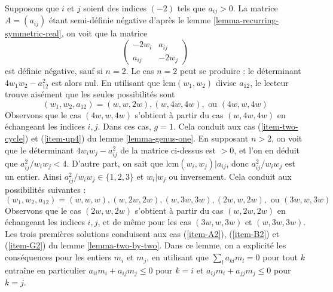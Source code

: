 \medskip\noindent
Supposons que $i$ et $j$ soient des indices $(-2)$ tels que $a_{ij} > 0$.
La matrice $A = (a_{ij})$ étant semi-définie négative d'après le
lemme \ref{lemma-recurring-symmetric-real}, on voit que la matrice
$$
\left(
\begin{matrix}
-2w_i & a_{ij} \\
a_{ij} & -2w_j
\end{matrix}
\right)
$$
est définie négative, sauf si $n = 2$. Le cas $n = 2$ peut se produire :
le déterminant $4w_1w_2 - a_{12}^2$ est alors nul. En utilisant que
$\text{lcm}(w_1, w_2)$ divise $a_{12}$, le lecteur trouve aisément
que les seules possibilités sont
$$
(w_1, w_2, a_{12}) = (w, w, 2w), (w, 4w, 4w), \text{ ou }(4w, w, 4w)
$$
Observons que le cas $(4w, w, 4w)$ s'obtient à partir du cas
$(w, 4w, 4w)$ en échangeant les indices $i, j$.
Dans ces cas, $g = 1$. Cela conduit aux cas
(\ref{item-two-cycle}) et (\ref{item-up4}) du lemme \ref{lemma-genus-one}.
En supposant $n > 2$, on voit
que le déterminant $4w_iw_j - a_{ij}^2$ de la matrice ci-dessus
est $> 0$, et l'on en déduit que $a_{ij}^2/w_iw_j < 4$.
D'autre part, on sait que $\text{lcm}(w_i, w_j) | a_{ij}$,
donc $a_{ij}^2/w_iw_j$ est un entier.
Ainsi $a_{ij}^2/w_iw_j \in \{1, 2, 3\}$ et $w_i | w_j$ ou
inversement. Cela conduit aux possibilités suivantes :
$$
(w_1, w_2, a_{12}) = (w, w, w), (w, 2w, 2w), (w, 3w, 3w),
(2w, w, 2w), \text{ ou }(3w, w, 3w)
$$
Observons que le cas $(2w, w, 2w)$ s'obtient à partir du cas
$(w, 2w, 2w)$ en échangeant les indices $i, j$, et de même
pour les cas $(3w, w, 3w)$ et $(w, 3w, 3w)$. Les trois premières
solutions conduisent aux cas (\ref{item-A2}), (\ref{item-B2}) et
(\ref{item-G2}) du lemme \ref{lemma-two-by-two}. Dans ce lemme,
on a explicité les conséquences pour les entiers $m_i$ et $m_j$,
en utilisant que $\sum_l a_{kl}m_l = 0$ pour tout $k$ entraîne en particulier
$a_{ii}m_i + a_{ij}m_j \leq 0$ pour $k = i$ et
$a_{ij}m_i + a_{jj}m_j \leq 0$ pour $k = j$.

